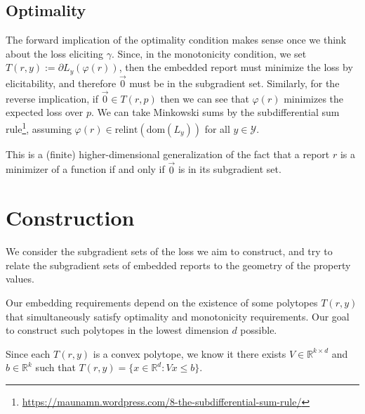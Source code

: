 \documentclass[12pt]{article}
\newcommand{\Comments}{1}
\newcommand{\mynote}[2]{\ifnum\Comments=1\textcolor{#1}{#2}\fi}
\newcommand{\jessie}[1]{\mynote{purple}{[JF: #1]}}
\newcommand{\reals}{\mathbb{R}}
\newcommand{\dom}{\mathrm{dom}}
\newcommand{\relint}{\mathrm{relint}}
\newcommand{\Y}{\mathcal{Y}}
\newcommand{\inprod}[2]{\langle #1, #2 \rangle}%
\newcommand{\conv}{\mathrm{conv}}
\begin{document}
%


\subsection*{Optimality}
The forward implication of the optimality condition makes sense once we think about the loss eliciting $\gamma$.
Since, in the monotonicity condition, we set $T(r,y) := \partial L_y(\varphi(r))$, then the embedded report must minimize the loss by elicitability, and therefore $\vec 0$ must be in the subgradient set.
Similarly, for the reverse implication, if $\vec 0 \in T(r,p)$ then we can see that $\varphi(r)$ minimizes the expected loss over $p$.
We can take Minkowski sums by the subdifferential sum rule\footnote{\url{https://maunamn.wordpress.com/8-the-subdifferential-sum-rule/}}, assuming $\varphi(r) \in \relint(\dom(L_y))$ for all $y \in \Y$.


This is a (finite) higher-dimensional generalization of the fact that a report $r$ is a minimizer of a function if and only if $\vec 0$ is in its subgradient set.



\section*{Construction}
We consider the subgradient sets of the loss we aim to construct, and try to relate the subgradient sets of embedded reports to the geometry of the property values.

Our embedding requirements depend on the existence of some polytopes $T(r,y)$ that simultaneously satisfy optimality and monotonicity requirements.
Our goal to construct such polytopes in the lowest dimension $d$ possible.

Since each $T(r,y)$ is a convex polytope, we know it there exists $V \in \reals^{k \times d}$ and $b \in \reals^k$ such that $T(r,y) = \{x \in \reals^d : Vx \leq b\}$.
\end{document}
